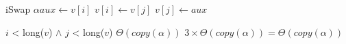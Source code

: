\begin{Algoritmos}
  \begin{algoritmo}{iSwap}{}
    $\alpha aux \gets v[i]$ \; 
    $v[i] \gets v[j]$ \; 
    $v[j] \gets aux$ \; 
  \end{algoritmo}
  \datosAlgoritmo{} %
  {$i$ < long($v$) $\land$ $j$ < long($v$)} %
  {} %
  {$\Theta(copy(\alpha))$} %
  {$3 \times \Theta(copy(\alpha)) = \Theta(copy(\alpha))$} %

\end{Algoritmos}
